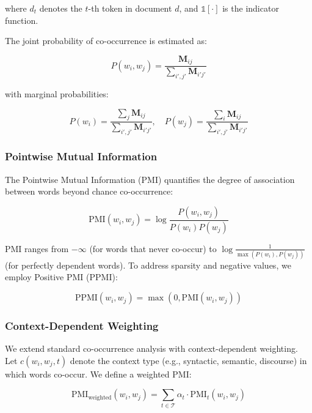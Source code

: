 \documentclass[conference]{IEEEtran}
\begin{document}
where $d_t$ denotes the $t$-th token in document $d$, and $\mathbb{1}[\cdot]$ is the indicator function.

The joint probability of co-occurrence is estimated as:

\begin{equation}
P(w_i, w_j) = \frac{\mathbf{M}_{ij}}{\sum_{i',j'} \mathbf{M}_{i'j'}}
\end{equation}

with marginal probabilities:

\begin{equation}
P(w_i) = \frac{\sum_j \mathbf{M}_{ij}}{\sum_{i',j'} \mathbf{M}_{i'j'}}, \quad P(w_j) = \frac{\sum_i \mathbf{M}_{ij}}{\sum_{i',j'} \mathbf{M}_{i'j'}}
\end{equation}

\subsubsection{Pointwise Mutual Information}

The Pointwise Mutual Information (PMI) quantifies the degree of association between words beyond chance co-occurrence:

\begin{equation}
\text{PMI}(w_i, w_j) = \log \frac{P(w_i, w_j)}{P(w_i) P(w_j)}
\end{equation}

PMI ranges from $-\infty$ (for words that never co-occur) to $\log \frac{1}{\max(P(w_i), P(w_j))}$ (for perfectly dependent words). To address sparsity and negative values, we employ Positive PMI (PPMI):

\begin{equation}
\text{PPMI}(w_i, w_j) = \max(0, \text{PMI}(w_i, w_j))
\end{equation}

\subsubsection{Context-Dependent Weighting}

We extend standard co-occurrence analysis with context-dependent weighting. Let $c(w_i, w_j, t)$ denote the context type (e.g., syntactic, semantic, discourse) in which words co-occur. We define a weighted PMI:

\begin{equation}
\text{PMI}_{\text{weighted}}(w_i, w_j) = \sum_{t \in \mathcal{T}} \alpha_t \cdot \text{PMI}_t(w_i, w_j)
\end{equation}
\end{document}
